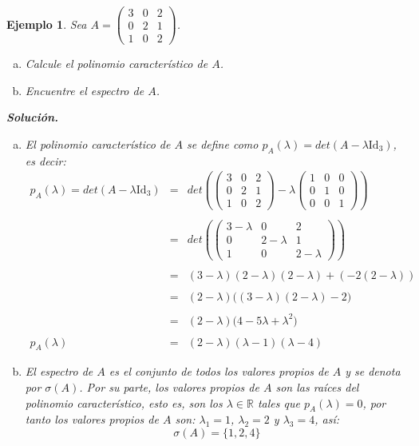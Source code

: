 \documentclass[12pt]{book}
\newtheorem{ejem}{Ejemplo}
\def\R{\mathbb{R}}
\begin{document}
\begin{ejem}
Sea $A=\left(\begin{array}{ccc} 3 & 0 & 2 \\ 0 & 2 & 1 \\ 1 & 0 &2  \end{array}\right)$.
\begin{enumerate}[a)]
\item Calcule el polinomio caracter\'istico de $A$.
\item Encuentre el espectro de $A$.
\end{enumerate}

{\em 
\textbf{Soluci\'on.}

\begin{enumerate}[a)]
\item El polinomio caracter\'istico de $A$ se define como $p_A(\lambda)=det(A-\lambda \text{Id}_3)$, es decir:
\begin{eqnarray*}
p_A(\lambda)=det(A-\lambda \text{Id}_3)&=& det\left(\left(\begin{array}{ccc} 3 & 0 & 2 \\ 0 & 2 & 1 \\ 1 & 0 &2  \end{array}\right)- \lambda\left(\begin{array}{ccc} 1 & 0 & 0 \\ 0 & 1 & 0 \\ 0 & 0 & 1 \end{array}\right)\right)\\
\\
&=&det\left(\left(\begin{array}{ccc} 3-\lambda & 0 & 2  \\ 0 & 2-\lambda & 1 \\ 1 & 0 & 2-\lambda \end{array}\right)\right)\\ 
\\
&=&(3-\lambda)(2-\lambda)(2-\lambda)+(-2(2-\lambda))\\
\\
&=&(2-\lambda)\Big((3-\lambda)(2-\lambda)-2\Big)\\
\\
&=&(2-\lambda)\Big(4-5\lambda+\lambda^2\Big)\\
\\
p_A(\lambda)&=&(2-\lambda)(\lambda-1)(\lambda-4)
\end{eqnarray*}

\item El espectro de $A$ es el conjunto de todos los valores propios de $A$ y se denota por $\sigma(A)$. Por su parte, los valores propios de $A$ son las ra\'ices del polinomio caracter\'istico, esto es, son los $\lambda\in\R$ tales que $p_A(\lambda)=0$, por tanto los valores propios de $A$ son: $\lambda_1=1$, $\lambda_2=2$ y $\lambda_3=4$, as\'i:
$$\sigma(A)=\{1,2,4\}$$
\end{enumerate}}
\end{ejem}
\end{document}
